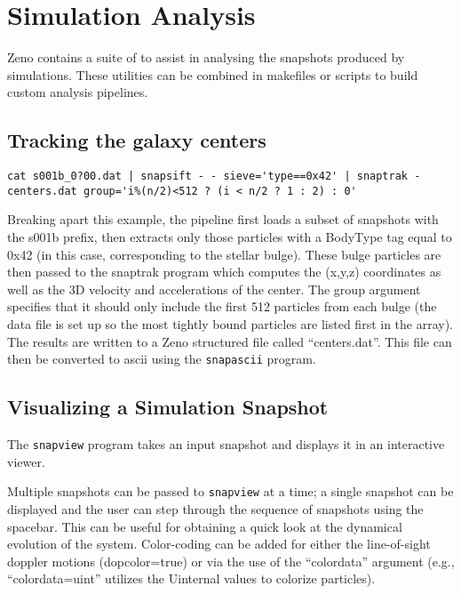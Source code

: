 \section{Simulation Analysis}
\label{sec:Analysis}

Zeno contains a suite of to assist in analysing the snapshots produced by simulations. These utilities can be combined in makefiles or scripts to build custom analysis pipelines.

\subsection{Tracking the galaxy centers}

\begin{verbatim}
cat s001b_0?00.dat | snapsift - - sieve='type==0x42' | snaptrak - centers.dat group='i%(n/2)<512 ? (i < n/2 ? 1 : 2) : 0'
\end{verbatim}

Breaking apart this example, the pipeline first loads a subset of snapshots with the s001b prefix, then extracts only those particles with a BodyType tag equal to 0x42 (in this case, corresponding to the stellar bulge). These bulge particles are then passed to the snaptrak program which computes the (x,y,z) coordinates as well as the 3D velocity and accelerations of the center. The group argument specifies that it should only include the first 512 particles from each bulge (the data file is set up so the most tightly bound particles are listed first in the array). The results are written to a Zeno structured file called ``centers.dat''. This file can then be converted to ascii using the \texttt{snapascii} program.

\subsection{Visualizing a Simulation Snapshot}

The \texttt{snapview} program takes an input snapshot and displays it in an interactive viewer. 

Multiple snapshots can be passed to \texttt{snapview} at a time; a single snapshot can be displayed and the user can step through the sequence of snapshots using the spacebar. This can be useful for obtaining a quick look at the dynamical evolution of the system. Color-coding can be added for either the line-of-sight doppler motions (dopcolor=true) or via the use of the ``colordata'' argument (e.g., ``colordata=uint'' utilizes the Uinternal values to colorize particles).

